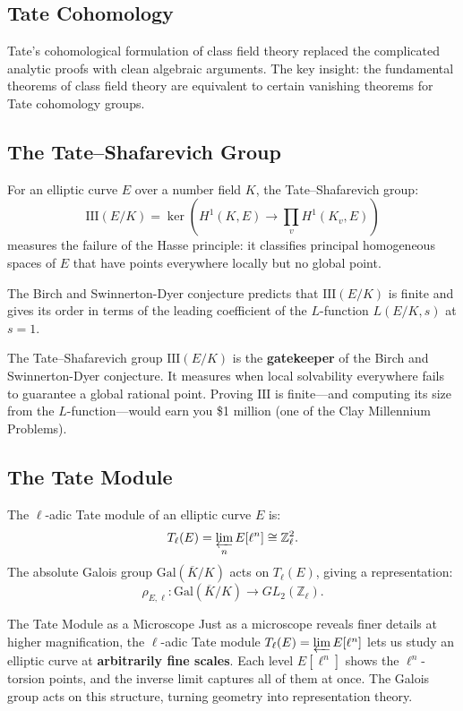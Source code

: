 \subsection{Tate Cohomology}

Tate's cohomological formulation of class field theory replaced the complicated analytic proofs with clean algebraic arguments. The key insight: the fundamental theorems of class field theory are equivalent to certain vanishing theorems for Tate cohomology groups.

\subsection{The Tate--Shafarevich Group}

For an elliptic curve $E$ over a number field $K$, the Tate--Shafarevich group:
\[
\mathrm{III}(E/K) = \ker\left(H^1(K, E) \to \prod_v H^1(K_v, E)\right)
\]
measures the failure of the Hasse principle: it classifies principal homogeneous spaces of $E$ that have points everywhere locally but no global point.

The Birch and Swinnerton-Dyer conjecture predicts that $\mathrm{III}(E/K)$ is finite and gives its order in terms of the leading coefficient of the $L$-function $L(E/K, s)$ at $s=1$.

\begin{whyitmatters}
The Tate--Shafarevich group $\mathrm{III}(E/K)$ is the \textbf{gatekeeper} of the Birch and Swinnerton-Dyer conjecture. It measures when local solvability everywhere fails to guarantee a global rational point. Proving $\mathrm{III}$ is finite---and computing its size from the $L$-function---would earn you \$1 million (one of the Clay Millennium Problems).
\end{whyitmatters}

\subsection{The Tate Module}

The $\ell$-adic Tate module of an elliptic curve $E$ is:
\[
T_\ell(E) = \varprojlim_n E[\ell^n] \cong \mathbb{Z}_\ell^2.
\]
The absolute Galois group $\mathrm{Gal}(\overline{K}/K)$ acts on $T_\ell(E)$, giving a representation:
\[
\rho_{E,\ell}: \mathrm{Gal}(\overline{K}/K) \to GL_2(\mathbb{Z}_\ell).
\]

\begin{analogy}{The Tate Module as a Microscope}
Just as a microscope reveals finer details at higher magnification, the $\ell$-adic Tate module $T_\ell(E) = \varprojlim E[\ell^n]$ lets us study an elliptic curve at \textbf{arbitrarily fine scales}. Each level $E[\ell^n]$ shows the $\ell^n$-torsion points, and the inverse limit captures all of them at once. The Galois group acts on this structure, turning geometry into representation theory.
\end{analogy}

